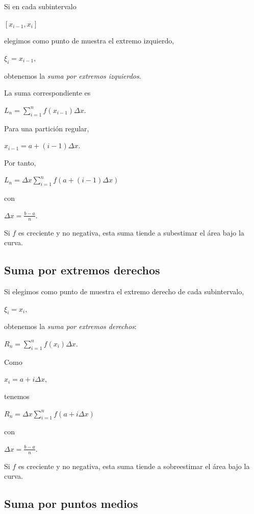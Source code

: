 \documentclass[12pt]{article}
\begin{document}
Si en cada subintervalo

$
[x_{i-1},x_i]
$

elegimos como punto de muestra el extremo izquierdo,

$
\xi_i=x_{i-1},
$

obtenemos la \emph{suma por extremos izquierdos}.

La suma correspondiente es

$
L_n
=
\sum_{i=1}^{n}
f(x_{i-1})\Delta x.
$

Para una partición regular,

$
x_{i-1}
=
a+(i-1)\Delta x.
$

Por tanto,

$
\boxed{
L_n
=
\Delta x
\sum_{i=1}^{n}
f\left(a+(i-1)\Delta x\right)
}
$

con

$
\Delta x=\frac{b-a}{n}.
$

Si $f$ es creciente y no negativa, esta suma tiende a subestimar el área
bajo la curva.

\subsection*{Suma por extremos derechos}

Si elegimos como punto de muestra el extremo derecho de cada subintervalo,

$
\xi_i=x_i,
$

obtenemos la \emph{suma por extremos derechos}:

$
R_n
=
\sum_{i=1}^{n}
f(x_i)\Delta x.
$

Como

$
x_i=a+i\Delta x,
$

tenemos

$
\boxed{
R_n
=
\Delta x
\sum_{i=1}^{n}
f\left(a+i\Delta x\right)
}
$

con

$
\Delta x=\frac{b-a}{n}.
$

Si $f$ es creciente y no negativa, esta suma tiende a sobreestimar el área
bajo la curva.

\subsection*{Suma por puntos medios}
\end{document}
